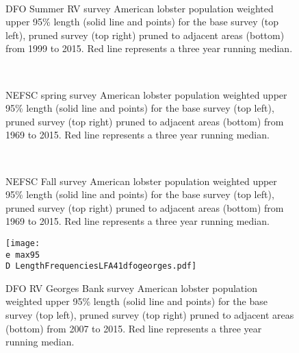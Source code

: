 \documentclass[11pt]{article}
\newcommand{\D}{.}
\newcommand{\e}{/backup/bio_data/bio.lobster/figures/} %
\begin{document}


\begin{figure}
\centering
{}
\\
\caption{DFO Summer RV survey American lobster population weighted upper 95\% length (solid line and points) for the base survey (top left), pruned survey (top right) pruned to adjacent areas (bottom) from 1999 to 2015. Red line represents a three year running median.  }
\end{figure}
\clearpage


\begin{figure}
\centering
{}
\\
\caption{NEFSC spring survey American lobster population weighted upper 95\% length (solid line and points) for the base survey (top left), pruned survey (top right) pruned to adjacent areas (bottom) from 1969 to 2015. Red line represents a three year running median.}
\end{figure}
\clearpage



\begin{figure}
\centering
{}
\\
\caption{NEFSC Fall survey American lobster population weighted upper 95\% length (solid line and points) for the base survey (top left), pruned survey (top right) pruned to adjacent areas (bottom) from 1969 to 2015. Red line represents a three year running median.}
\end{figure}
\clearpage


\begin{figure}

    \texttt{[image: \\e max95\\D LengthFrequenciesLFA41dfogeorges.pdf]}
    \caption{DFO RV Georges Bank survey American lobster population weighted upper 95\% length (solid line and points) for the base survey (top left), pruned survey (top right) pruned to adjacent areas (bottom) from 2007 to 2015. Red line represents a three year running median.}

\end{figure}
\end{document}
